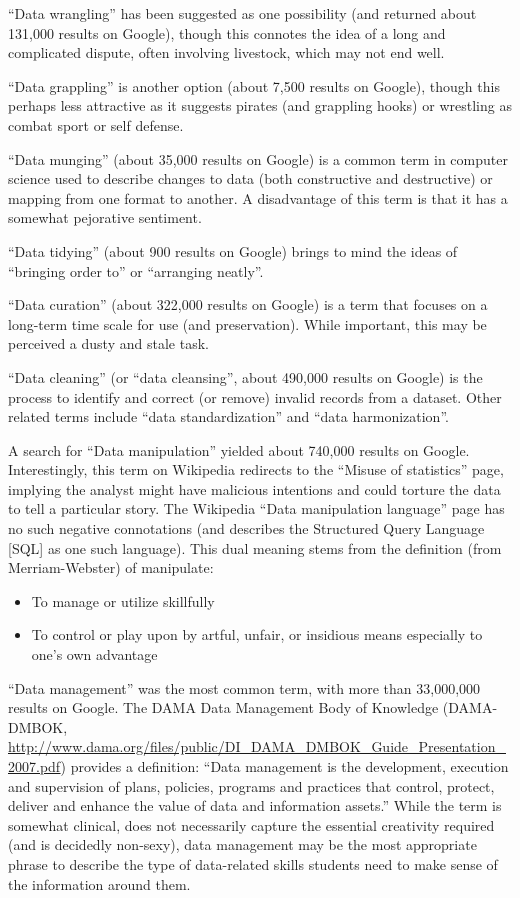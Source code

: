 \documentclass[]{article}
\begin{document}
``Data wrangling'' has been suggested as one possibility (and returned
about 131,000 results on Google), though this connotes the idea of a
long and complicated dispute, often involving livestock, which may not
end well.

``Data grappling'' is another option (about 7,500 results on Google),
though this perhaps less attractive as it suggests pirates (and
grappling hooks) or wrestling as combat sport or self defense.

``Data munging'' (about 35,000 results on Google) is a common term in
computer science used to describe changes to data (both constructive and
destructive) or mapping from one format to another. A disadvantage of
this term is that it has a somewhat pejorative sentiment.

``Data tidying'' (about 900 results on Google) brings to mind the ideas
of ``bringing order to'' or ``arranging neatly''.

``Data curation'' (about 322,000 results on Google) is a term that
focuses on a long-term time scale for use (and preservation). While
important, this may be perceived a dusty and stale task.

``Data cleaning'' (or ``data cleansing'', about 490,000 results on
Google) is the process to identify and correct (or remove) invalid
records from a dataset. Other related terms include ``data
standardization'' and ``data harmonization''.

A search for ``Data manipulation'' yielded about 740,000 results on
Google. Interestingly, this term on Wikipedia redirects to the ``Misuse
of statistics'' page, implying the analyst might have malicious
intentions and could torture the data to tell a particular story. The
Wikipedia ``Data manipulation language'' page has no such negative
connotations (and describes the Structured Query Language {[}SQL{]} as
one such language). This dual meaning stems from the definition (from
Merriam-Webster) of manipulate:

\begin{itemize}
\itemsep1pt\parskip0pt
\item
  To manage or utilize skillfully
\item
  To control or play upon by artful, unfair, or insidious means
  especially to one's own advantage
\end{itemize}

``Data management'' was the most common term, with more than 33,000,000
results on Google. The DAMA Data Management Body of Knowledge
(DAMA-DMBOK,
\url{http://www.dama.org/files/public/DI_DAMA_DMBOK_Guide_Presentation_2007.pdf})
provides a definition: ``Data management is the development, execution
and supervision of plans, policies, programs and practices that control,
protect, deliver and enhance the value of data and information assets.''
While the term is somewhat clinical, does not necessarily capture the
essential creativity required (and is decidedly non-sexy), data
management may be the most appropriate phrase to describe the type of
data-related skills students need to make sense of the information
around them.
\end{document}

